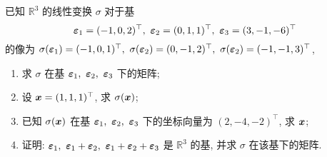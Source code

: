 \begin{example}[2003 南京航空航天大学]
    已知 $\mathbb{R}^3$ 的线性变换 $\sigma$ 对于基 $$\vb*{\varepsilon}_1=(-1,0,2)^\top,~\vb*{\varepsilon}_2=(0,1,1)^\top,~\vb*{\varepsilon}_3=(3,-1,-6)^\top$$
    的像为 $\sigma(\vb*{\varepsilon}_1)=(-1,0,1)^\top,~\sigma(\vb*{\varepsilon}_2)=(0,-1,2)^\top,~\sigma(\vb*{\varepsilon}_2)=(-1,-1,3)^\top$, 
    \begin{enumerate}[label=(\arabic{*})]
        \item 求 $\sigma$ 在基 $\vb*{\varepsilon}_1,~\vb*{\varepsilon}_2,~\vb*{\varepsilon}_3$ 下的矩阵;
        \item 设 $\vb*{x}=(1,1,1)^\top$, 求 $\sigma(\vb*{x})$;
        \item 已知 $\sigma(\vb*{x})$ 在基 $\vb*{\varepsilon}_1,~\vb*{\varepsilon}_2,~\vb*{\varepsilon}_3$ 下的坐标向量为 $(2,-4,-2)^\top$, 求 $\vb*{x}$;
        \item 证明: $\vb*{\varepsilon}_1,~\vb*{\varepsilon}_1+\vb*{\varepsilon}_2,~\vb*{\varepsilon}_1+\vb*{\varepsilon}_2+\vb*{\varepsilon}_3$ 是 $\mathbb{R}^3$ 的基, 并求 $\sigma$ 在该基下的矩阵.
    \end{enumerate}
\end{example}
